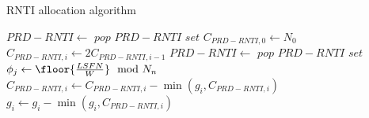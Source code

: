 \begin{algorithm}
	\caption{RNTI allocation algorithm} %
	\label{alg:resource-allocation-algo} %
	\begin{algorithmic}[1] %
		\State $PRD-RNTI \gets $ $pop$ $PRD-RNTI$ $set$
		\State $C_{PRD-RNTI, 0} \gets N_{0} $
		 \label{algo: for-loop-all-groups}
		\State $C_{PRD-RNTI, i} \gets 2C_{PRD-RNTI, i-1}$
		\EndIf
		 \label{algo:while-loop}
		\State $PRD-RNTI \gets $ $pop$ $PRD-RNTI$ $set$
		\EndIf
		 \label{algo:allocation-for-loop}
		\State $\phi _{j} \gets \floor{\frac{LSFN}{W}} \mod N_{n} $
		\EndFor \label{algo:end-allocation-for-loop}
		\State $C_{PRD-RNTI, i} \gets C_{PRD-RNTI, i}-\min (g_{i}, C_{PRD-RNTI, i})$
		\State $g_{i} \gets g_{i} - \min (g_{i}, C_{PRD-RNTI, i})$
		\EndWhile \label{algo:end-while-loop}
		\EndFor \label{algo: end-for-loop-all-groups}
		\EndProcedure
	\end{algorithmic}
\end{algorithm}

